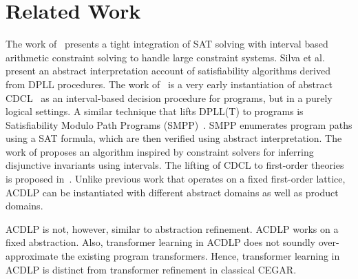 \section{Related Work}
%
The work of~\cite{franzle} presents a tight integration of SAT solving
with interval based arithmetic constraint solving to handle large constraint
systems. 
%
Silva et al.~\cite{sas12} present an abstract interpretation account of 
satisfiability algorithms derived from DPLL procedures.  
%
The work of~\cite{tacas12} is a very early instantiation of abstract 
CDCL~\cite{sas12} as an interval-based decision procedure for programs, 
but in a purely logical settings.  
%
A similar technique that lifts DPLL(T) to programs is Satisfiability Modulo 
Path Programs (SMPP)~\cite{SMPP}. SMPP enumerates program paths using a SAT 
formula, which are then verified using abstract interpretation.  
%
The work of \cite{DBLP:conf/esop/MineBR16} proposes an algorithm inspired by 
constraint solvers for inferring disjunctive invariants using intervals.
%
The lifting of CDCL to first-order theories is proposed
in~\cite{dpll,ndsmt,vmcai13}.
%
  Unlike previous work that operates on a fixed first-order lattice,
  ACDLP can be instantiated with different abstract domains as well as {product
  domains}.  
  
  ACDLP is not, however, similar to abstraction refinement. ACDLP works on a fixed
  abstraction. Also, transformer learning in ACDLP does not soundly over-approximate
  the existing program transformers. Hence, transformer learning in ACDLP is
  distinct from transformer refinement in classical CEGAR. 

%
%
%
%

